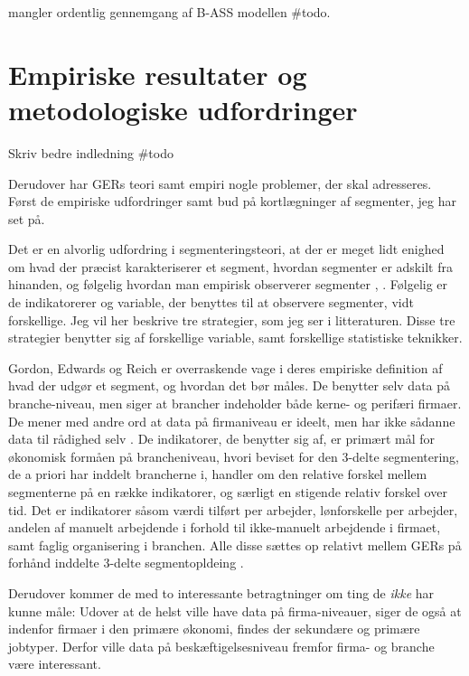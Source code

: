mangler ordentlig gennemgang af B-ASS modellen \#todo.


\section{Empiriske resultater og metodologiske udfordringer  \label{sec_teori_AST_metodeogempiri}}


Skriv bedre indledning \#todo

Derudover har GERs teori samt empiri nogle problemer, der skal adresseres. Først de empiriske udfordringer samt bud på kortlægninger af segmenter, jeg har set på.

Det er en alvorlig udfordring i segmenteringsteori, at der er meget lidt enighed om hvad der præcist karakteriserer et segment, hvordan segmenter er adskilt fra hinanden, og følgelig hvordan man empirisk observerer segmenter \parencite[71]{Leontaridi1998}, \parencite[1231]{Cain1976}. Følgelig er de indikatorerer og variable, der benyttes til at observere segmenter, vidt forskellige. Jeg vil her beskrive tre strategier, som jeg ser i litteraturen. Disse tre strategier benytter sig af forskellige variable, samt forskellige statistiske teknikker. 

Gordon, Edwards og Reich er overraskende vage i deres empiriske definition af hvad der udgør et segment, og hvordan det bør måles.
De benytter selv data på branche-niveau, men siger at brancher  indeholder både kerne- og perifæri firmaer. De mener med andre ord at data på firmaniveau er ideelt, men har ikke sådanne data til rådighed selv \parencite[193]{Gordon1982}. De indikatorer, de benytter sig af, er primært mål for økonomisk formåen på brancheniveau, hvori beviset for den 3-delte segmentering, de a priori har inddelt brancherne i, handler om den relative forskel mellem segmenterne på en række indikatorer, og særligt en stigende relativ forskel over tid. 
Det er indikatorer såsom værdi tilført per arbejder, lønforskelle per arbejder, andelen af manuelt arbejdende i forhold til ikke-manuelt arbejdende i firmaet, samt faglig organisering i branchen. Alle disse sættes op relativt mellem GERs på forhånd inddelte 3-delte segmentopldeing \parencite[193]{Gordon1982}. 

Derudover kommer de med to interessante betragtninger om ting de \emph{ikke} har kunne måle: Udover at de helst ville have data på firma-niveauer, siger de også at indenfor firmaer i den primære økonomi, findes der sekundære og primære jobtyper. Derfor ville data på beskæftigelsesniveau fremfor firma- og branche være interessant\parencite[193]{Gordon1982}. 



